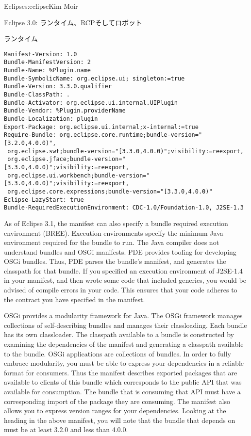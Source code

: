 \begin{aosachapter}{Eclipse}{s:eclipse}{Kim Moir}
\begin{aosasect1}{Eclipse 3.0: ランタイム、RCPそしてロボット}
\begin{aosasect2}{ランタイム}
\begin{verbatim}
Manifest-Version: 1.0
Bundle-ManifestVersion: 2
Bundle-Name: %Plugin.name
Bundle-SymbolicName: org.eclipse.ui; singleton:=true
Bundle-Version: 3.3.0.qualifier
Bundle-ClassPath: .
Bundle-Activator: org.eclipse.ui.internal.UIPlugin
Bundle-Vendor: %Plugin.providerName
Bundle-Localization: plugin
Export-Package: org.eclipse.ui.internal;x-internal:=true
Require-Bundle: org.eclipse.core.runtime;bundle-version="[3.2.0,4.0.0)",
 org.eclipse.swt;bundle-version="[3.3.0,4.0.0)";visibility:=reexport,
 org.eclipse.jface;bundle-version="[3.3.0,4.0.0)";visibility:=reexport,
 org.eclipse.ui.workbench;bundle-version="[3.3.0,4.0.0)";visibility:=reexport,
 org.eclipse.core.expressions;bundle-version="[3.3.0,4.0.0)"
Eclipse-LazyStart: true
Bundle-RequiredExecutionEnvironment: CDC-1.0/Foundation-1.0, J2SE-1.3
\end{verbatim}

As of Eclipse 3.1, the manifest can also specify a bundle required
execution environment (BREE). Execution environments specify the
minimum Java environment required for the bundle to run. The Java
compiler does not understand bundles and OSGi manifests. PDE provides
tooling for developing OSGi bundles. Thus, PDE parses the bundle's
manifest, and generates the classpath for that bundle. If you
specified an execution environment of J2SE-1.4 in your manifest, and
then wrote some code that included generics, you would be advised of
compile errors in your code. This ensures that your code adheres to
the contract you have specified in the manifest.

OSGi provides a modularity framework for Java. The OSGi framework
manages collections of self-describing bundles and manages their
classloading. Each bundle has its own classloader. The classpath
available to a bundle is constructed by examining the dependencies of
the manifest and generating a classpath available to the bundle. OSGi
applications are collections of bundles. In order to fully embrace
modularity, you must be able to express your dependencies in a
reliable format for consumers. Thus the manifest describes exported
packages that are available to clients of this bundle which
corresponds to the public API that was available for consumption.  The
bundle that is consuming that API must have a corresponding import of
the package they are consuming. The manifest also allows you to
express version ranges for your dependencies.  Looking at
the  heading in the above manifest, you will note
that the  bundle that
 depends on must be at least 3.2.0 and less than
4.0.0.


\end{aosasect2}
\end{aosasect1}
\end{aosachapter}

